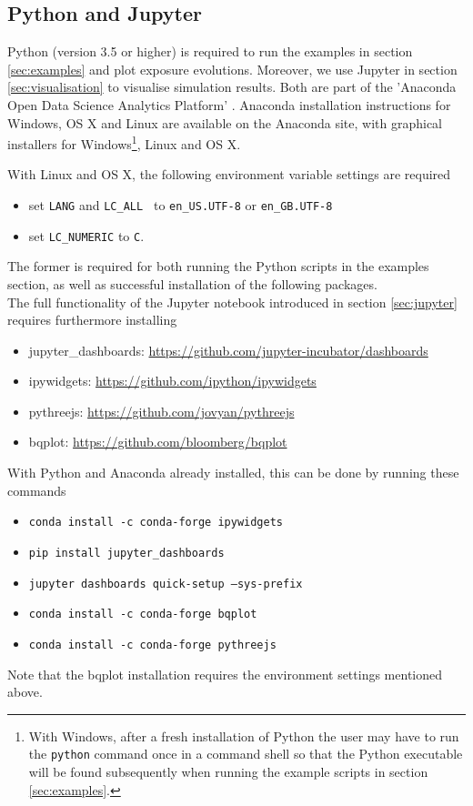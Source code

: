 \documentclass[12pt, a4paper]{article}
\begin{document}
\subsection{Python and Jupyter}\label{sec:python}

Python (version 3.5 or higher) is required to run the examples in section \ref{sec:examples} and plot exposure
evolutions. Moreover, we use Jupyter \cite{jupyter} in section \ref{sec:visualisation} to visualise simulation
results. Both are part of the 'Anaconda Open Data Science Analytics Platform' \cite{Anaconda}. Anaconda installation
instructions for Windows, OS X and Linux are available on the Anaconda site, with graphical installers for
Windows\footnote{With Windows, after a fresh installation of Python the user may have to run the {\tt python} command
  once in a command shell so that the Python executable will be found subsequently when running the example scripts in
  section \ref{sec:examples}.}, Linux and OS X.

With Linux and OS X, the following environment variable settings are required
\begin{itemize}
\item set {\tt LANG} and {\tt LC\_ALL } to {\tt en\_US.UTF-8} or {\tt en\_GB.UTF-8}
\item set {\tt LC\_NUMERIC} to {\tt C}. 
\end{itemize}
The former is required for both running the Python scripts in the examples section, as well as successful installation
of the following packages. \\

The full functionality of the Jupyter notebook introduced in section \ref{sec:jupyter} requires furthermore installing
\begin{itemize}
\item jupyter\_dashboards: \url{https://github.com/jupyter-incubator/dashboards}
\item ipywidgets: \url{https://github.com/ipython/ipywidgets}
\item pythreejs: \url{https://github.com/jovyan/pythreejs}
\item bqplot: \url{https://github.com/bloomberg/bqplot}
\end{itemize}
With Python and Anaconda already installed, this can be done by running these commands
\begin{itemize}
\item {\tt conda install -c conda-forge ipywidgets}
\item {\tt pip install jupyter\_dashboards}
\item {\tt jupyter dashboards quick-setup --sys-prefix}
\item {\tt conda install -c conda-forge bqplot}
\item {\tt conda install -c conda-forge pythreejs}
\end{itemize}
Note that the bqplot installation requires the environment settings mentioned above.
\end{document}
